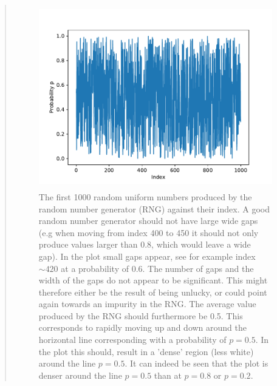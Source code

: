\begin{quote}
\begin{figure}[!hb]
\centering
\includegraphics[width=12cm, height=8.0cm]{./Plots/1_plot_index.pdf}
\caption{The first 1000 random uniform numbers produced by the random number generator (RNG) against their index. A good random number generator should not have large wide gaps  (e.g when moving from index 400 to 450 it should not only produce values larger than 0.8, which would leave a wide gap). In the plot small gaps appear, see for example index $\sim 420$ at a probability of 0.6. The number of gaps and the width of the gaps do not appear to be significant. This might therefore either be the result of being unlucky, or could point again towards an impurity in the RNG.   The average value produced by the RNG should furthermore be 0.5. This corresponds to rapidly moving up and down around the horizontal line corresponding with a probability of $ p = 0.5$. In the plot this should, result in a 'dense' region (less white) around the line $p = 0.5$. It can indeed be seen that the plot is denser around the line $p = 0.5$ than at $ p = 0.8$ or $p = 0.2$. }
\end{figure}


\end{quote}
